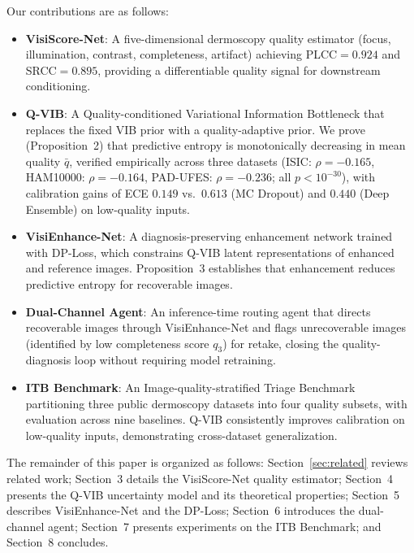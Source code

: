 Our contributions are as follows:
\begin{itemize}
  \item \textbf{VisiScore-Net}: A five-dimensional dermoscopy quality estimator (focus, illumination, contrast, completeness, artifact) achieving PLCC$=0.924$ and SRCC$=0.895$, providing a differentiable quality signal for downstream conditioning.

  \item \textbf{Q-VIB}: A Quality-conditioned Variational Information Bottleneck that replaces the fixed VIB prior with a quality-adaptive prior. We prove (Proposition~2) that predictive entropy is monotonically decreasing in mean quality $\bar{q}$, verified empirically across three datasets (ISIC: $\rho=-0.165$, HAM10000: $\rho=-0.164$, PAD-UFES: $\rho=-0.236$; all $p < 10^{-30}$), with calibration gains of ECE $0.149$ vs.\ $0.613$ (MC Dropout) and $0.440$ (Deep Ensemble) on low-quality inputs.

  \item \textbf{VisiEnhance-Net}: A diagnosis-preserving enhancement network trained with DP-Loss, which constrains Q-VIB latent representations of enhanced and reference images. Proposition~3 establishes that enhancement reduces predictive entropy for recoverable images. 

  \item \textbf{Dual-Channel Agent}: An inference-time routing agent that directs recoverable images through VisiEnhance-Net and flags unrecoverable images (identified by low completeness score $q_3$) for retake, closing the quality-diagnosis loop without requiring model retraining.

  \item \textbf{ITB Benchmark}: An Image-quality-stratified Triage Benchmark partitioning three public dermoscopy datasets into four quality subsets, with evaluation across nine baselines. Q-VIB consistently improves calibration on low-quality inputs, demonstrating cross-dataset generalization.
\end{itemize}

The remainder of this paper is organized as follows: Section~\ref{sec:related} reviews related work; Section~3 details the VisiScore-Net quality estimator; Section~4 presents the Q-VIB uncertainty model and its theoretical properties; Section~5 describes VisiEnhance-Net and the DP-Loss; Section~6 introduces the dual-channel agent; Section~7 presents experiments on the ITB Benchmark; and Section~8 concludes.
